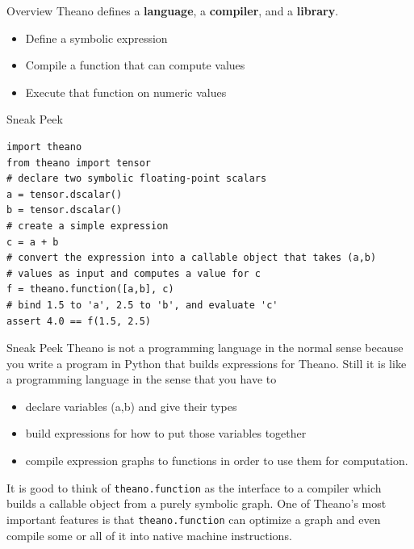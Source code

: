 \documentclass[a4paper,9pt]{beamer}
\begin{document}
\begin{frame}{Overview}
  Theano defines a {\bf language}, a {\bf compiler}, and a {\bf library}.
  \begin{itemize}
    \item Define a symbolic expression
    \item Compile a function that can compute values
    \item Execute that function on numeric values
  \end{itemize}
\end{frame}

\begin{frame}[fragile]{Sneak Peek}

    \begin{verbatim}
import theano
from theano import tensor
# declare two symbolic floating-point scalars
a = tensor.dscalar()
b = tensor.dscalar()
# create a simple expression
c = a + b
# convert the expression into a callable object that takes (a,b)
# values as input and computes a value for c
f = theano.function([a,b], c)
# bind 1.5 to 'a', 2.5 to 'b', and evaluate 'c'
assert 4.0 == f(1.5, 2.5)
    \end{verbatim}
\end{frame}

\begin{frame}[fragile]{Sneak Peek}
Theano is not a programming language in the normal sense because you write a program in Python that builds expressions for Theano. Still it is like a programming language in the sense that you have to
\begin{itemize}
    \item declare variables (a,b) and give their types
    \item build expressions for how to put those variables together
    \item compile expression graphs to functions in order to use them for computation.
\end{itemize}

It is good to think of \texttt{theano.function} as the interface to a compiler which builds a callable object from a purely symbolic graph. One of Theano’s most important features is that \texttt{theano.function} can optimize a graph and even compile some or all of it into native machine instructions.
    
\end{frame}
\end{document}
